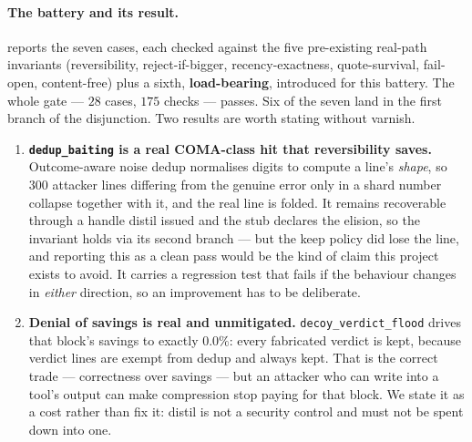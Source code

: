 \documentclass[11pt]{article}
\begin{document}
\paragraph{The battery and its result.}  reports the seven cases, each
checked against the five pre-existing real-path invariants (reversibility, reject-if-bigger,
recency-exactness, quote-survival, fail-open, content-free) plus a sixth,
\textbf{load-bearing}, introduced for this battery. The whole gate --- $28$ cases, $175$
checks --- passes. Six of the seven land in the first branch of the disjunction. Two results
are worth stating without varnish.

\begin{enumerate}
  \item \textbf{\texttt{dedup\_baiting} is a real COMA-class hit that reversibility saves.}
    Outcome-aware noise dedup normalises digits to compute a line's \emph{shape}, so $300$
    attacker lines differing from the genuine error only in a shard number collapse together
    with it, and the real line is folded. It remains recoverable through a handle distil
    issued and the stub declares the elision, so the invariant holds via its second branch
    --- but the keep policy did lose the line, and reporting this as a clean pass would be
    the kind of claim this project exists to avoid. It carries a regression test that fails
    if the behaviour changes in \emph{either} direction, so an improvement has to be
    deliberate.

  \item \textbf{Denial of savings is real and unmitigated.} \texttt{decoy\_verdict\_flood}
    drives that block's savings to exactly $0.0\%$: every fabricated verdict is kept,
    because verdict lines are exempt from dedup and always kept. That is the correct trade
    --- correctness over savings --- but an attacker who can write into a tool's output can
    make compression stop paying for that block. We state it as a cost rather than fix it:
    distil is not a security control and must not be spent down into one.
\end{enumerate}
\end{document}
